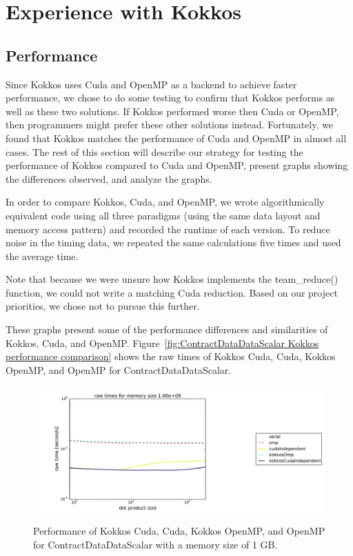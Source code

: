\chapter{Experience with Kokkos}
\section{Performance}
Since Kokkos uses Cuda and OpenMP as a backend to achieve faster performance, we
chose to do some testing to confirm that Kokkos performs as well as these two
solutions. If Kokkos performed worse then Cuda or OpenMP, then programmers might
prefer these other solutions instead.  Fortunately, we found that Kokkos matches
the performance of Cuda and OpenMP in almost all cases.  The rest of this
section will describe our strategy for testing the performance of Kokkos
compared to Cuda and OpenMP, present graphs showing the differences observed,
and analyze the graphs.

In order to compare Kokkos, Cuda, and OpenMP, we wrote algorithmically
equivalent code using all three paradigms (using the same data layout and memory
access pattern) and recorded the runtime of each version.  To reduce noise in
the timing data, we repeated the same calculations five times and used the
average time.

Note that because we were unsure how Kokkos implements the team\_reduce()
function, we could not write a matching Cuda reduction.  Based on our project
priorities, we chose not to pursue this further.

These graphs present some of the performance differences and similarities of
Kokkos, Cuda, and OpenMP. Figure~\ref{fig:ContractDataDataScalar Kokkos
performance comparison} shows the raw times of Kokkos Cuda, Cuda, Kokkos OpenMP,
and OpenMP for ContractDataDataScalar.

\begin{figure}[!ht]
{\includegraphics[scale=.4]{CDDS_RawTimes_2d_largestSize_Comparison.pdf}}
\caption[ContractDataDataScalar Kokkos performance comparison]{
    Performance of Kokkos Cuda, Cuda, Kokkos OpenMP,
and OpenMP for ContractDataDataScalar with a memory size of 1 GB.}
\label{fig:ContractDataDataScalar Kokkos performance comparison}
\end{figure}

